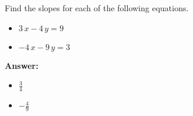  Find the slopes for each of the following equations. \begin{itemize}\item \( 3 \, x - 4 \, y = 9 \)\item \( -4 \, x - 9 \, y = 3 \)\end{itemize}

        \textbf{Answer:} \begin{itemize}\item \( \frac{3}{4} \)\item \( -\frac{4}{9} \)\end{itemize}
